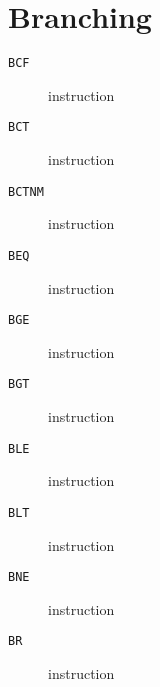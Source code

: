 \section{Branching}
\begin{description}
\item[\texttt{BCF}] instruction\\

\end{description}
\clearpage
\begin{description}
\item[\texttt{BCT}] instruction\\

\end{description}
\clearpage
\begin{description}
\item[\texttt{BCTNM}] instruction\\

\end{description}
\clearpage
\begin{description}
\item[\texttt{BEQ}] instruction\\

\end{description}
\clearpage
\begin{description}
\item[\texttt{BGE}] instruction\\

\end{description}
\clearpage
\begin{description}
\item[\texttt{BGT}] instruction\\

\end{description}
\clearpage
\begin{description}
\item[\texttt{BLE}] instruction\\

\end{description}
\clearpage
\begin{description}
\item[\texttt{BLT}] instruction\\

\end{description}
\clearpage
\begin{description}
\item[\texttt{BNE}] instruction\\

\end{description}
\clearpage
\begin{description}
\item[\texttt{BR}] instruction\\

\end{description}
